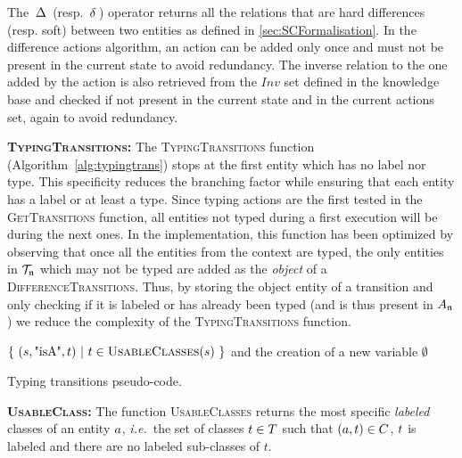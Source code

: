 \documentclass[a4paper,11pt,twoside]{StyleThese}
\begin{document}
The $\,\Delta\,$ (resp. $\,\delta\,$) operator returns all the relations that are hard differences (resp. soft) between two entities as defined in \ref{sec:SCFormalisation}. In the difference actions algorithm, an action can be added only once and must not be present in the current state to avoid redundancy. The inverse relation to the one added by the action is also retrieved from the $Inv$ set defined in the knowledge base and checked if not present in the current state and in the current actions set, again to avoid redundancy. 

\textbf{\textsc{TypingTransitions}:}
The \textsc{TypingTransitions} function (Algorithm~\ref{alg:typingtrans}) stops at the first entity which has no label nor type. This specificity reduces the branching factor while ensuring that each entity has a label or at least a type. Since typing actions are the first tested in the \textsc{GetTransitions} function, all entities not typed during a first execution will be during the next ones. In the implementation, this function has been optimized by observing that once all the entities from the context are typed, the only entities in $\mathcal{T}_{\mathfrak{n}}$ which may not be typed are added as the \textit{object} of a \textsc{DifferenceTransitions}. Thus, by storing the object entity of a transition and only checking if it is labeled or has already been typed (and is thus present in $A_{\mathfrak{n}}$) we reduce the complexity of the \textsc{TypingTransitions} function.

\begin{algorithm}[htb]
\begin{algorithmic}[1]
\State \Return $\{\ (s,\text{"isA"},t)\ |\ t \in \textsc{UsableClasses}(s)\ \} $ and the creation of a new variable 
\EndIf
\EndFor
\State \Return $\emptyset$
\EndFunction
\end{algorithmic}
 \caption{Typing transitions pseudo-code.}
 \label{alg:typingtrans}
\end{algorithm}

\textbf{\textsc{UsableClass}:}
The function \textsc{UsableClasses} returns the most specific \textit{labeled} classes of an entity $a$, \textit{i.e.}~the set of classes $t \in T$ such that $(a, t) \in C$, $t$ is labeled and there are no labeled sub-classes of $t$.
\end{document}
